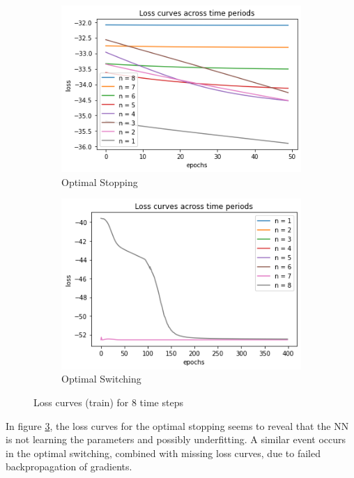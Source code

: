 \documentclass{article}
\begin{document}
\begin{figure}[H] 
\centering
\begin{subfigure}{.5\textwidth}
  \centering
  \includegraphics[width=.9\linewidth]{loss_curves_optStopping.png}
  \caption{Optimal Stopping}
  \label{fig:sub1}
\end{subfigure}%
\begin{subfigure}{.5\textwidth}
  \centering
  \includegraphics[width=.9\linewidth]{loss_curves_optSwitching.png}
  \caption{Optimal Switching}
  \label{fig:sub2}
\end{subfigure}
\caption{Loss curves (train) for 8 time steps}
\label{fig:test}
\end{figure}

In figure \ref{fig:test}, the loss curves for the optimal stopping seems to reveal that the NN is not learning the parameters and possibly underfitting. A similar event occurs in the optimal switching, combined with missing loss curves, due to failed backpropagation of gradients.
\end{document}
